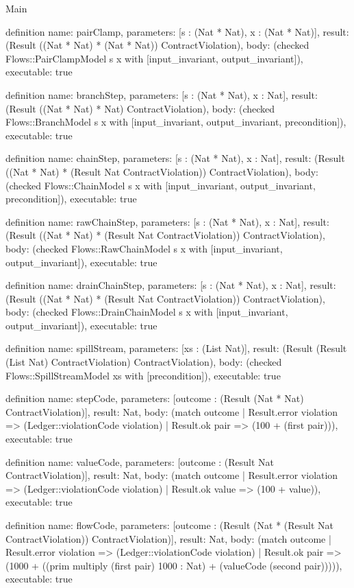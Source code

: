 \begin{lexlean}{Main}
\begin{semanticmodule}
definition{
  name: pairClamp,
  parameters: [s : (Nat * Nat), x : (Nat * Nat)],
  result: (Result ((Nat * Nat) * (Nat * Nat)) ContractViolation),
  body: (checked Flows::PairClampModel s x with [input_invariant, output_invariant]),
  executable: true
}

definition{
  name: branchStep,
  parameters: [s : (Nat * Nat), x : Nat],
  result: (Result ((Nat * Nat) * Nat) ContractViolation),
  body: (checked Flows::BranchModel s x with [input_invariant, output_invariant, precondition]),
  executable: true
}

definition{
  name: chainStep,
  parameters: [s : (Nat * Nat), x : Nat],
  result: (Result ((Nat * Nat) * (Result Nat ContractViolation)) ContractViolation),
  body: (checked Flows::ChainModel s x with [input_invariant, output_invariant, precondition]),
  executable: true
}

definition{
  name: rawChainStep,
  parameters: [s : (Nat * Nat), x : Nat],
  result: (Result ((Nat * Nat) * (Result Nat ContractViolation)) ContractViolation),
  body: (checked Flows::RawChainModel s x with [input_invariant, output_invariant]),
  executable: true
}

definition{
  name: drainChainStep,
  parameters: [s : (Nat * Nat), x : Nat],
  result: (Result ((Nat * Nat) * (Result Nat ContractViolation)) ContractViolation),
  body: (checked Flows::DrainChainModel s x with [input_invariant, output_invariant]),
  executable: true
}

definition{
  name: spillStream,
  parameters: [xs : (List Nat)],
  result: (Result (Result (List Nat) ContractViolation) ContractViolation),
  body: (checked Flows::SpillStreamModel xs with [precondition]),
  executable: true
}

definition{
  name: stepCode,
  parameters: [outcome : (Result (Nat * Nat) ContractViolation)],
  result: Nat,
  body: (match outcome
    | Result.error violation => (Ledger::violationCode violation)
    | Result.ok pair => (100 + (first pair))),
  executable: true
}

definition{
  name: valueCode,
  parameters: [outcome : (Result Nat ContractViolation)],
  result: Nat,
  body: (match outcome
    | Result.error violation => (Ledger::violationCode violation)
    | Result.ok value => (100 + value)),
  executable: true
}

definition{
  name: flowCode,
  parameters: [outcome : (Result (Nat * (Result Nat ContractViolation)) ContractViolation)],
  result: Nat,
  body: (match outcome
    | Result.error violation => (Ledger::violationCode violation)
    | Result.ok pair => (1000 + ((prim multiply (first pair) 1000 : Nat) + (valueCode (second pair))))),
  executable: true
}


\end{semanticmodule}
\end{lexlean}

